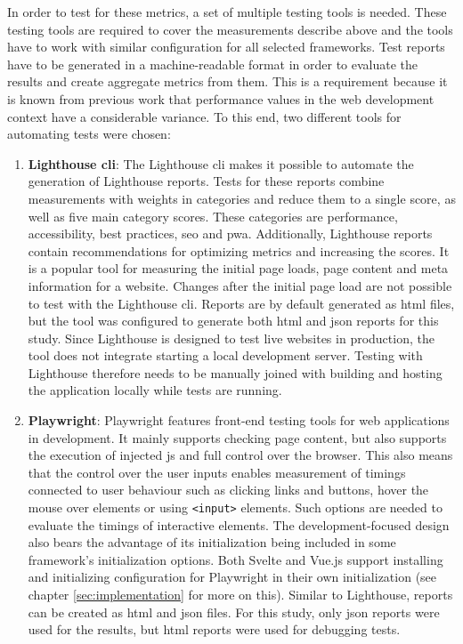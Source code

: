 \documentclass[a4paper, 12pt]{article}
\begin{document}
In order to test for these metrics, a set of multiple testing tools is needed.
These testing tools are required to cover the measurements describe above and the tools have to work with similar configuration for all selected frameworks.
Test reports have to be generated in a machine-readable format in order to evaluate the results and create aggregate metrics from them.
This is a requirement because it is known from previous work that performance values in the web development context have a considerable variance.
To this end, two different tools for automating tests were chosen:

\begin{enumerate}
  \item \textbf{Lighthouse \acrshort{cli}}: The Lighthouse \acrshort{cli} makes it possible to automate the generation of Lighthouse reports.
  Tests for these reports combine measurements with weights in categories and reduce them to a single score, as well as five main category scores.
  These categories are performance, accessibility, best practices, \acrfull{seo} and \acrfull{pwa}.
  Additionally, Lighthouse reports contain recommendations for optimizing metrics and increasing the scores.
  It is a popular tool for measuring the initial page loads, page content and meta information for a website.
  Changes after the initial page load are not possible to test with the Lighthouse \acrshort{cli}.
  Reports are by default generated as \acrshort{html} files, but the tool was configured to generate both \acrshort{html} and \acrshort{json} reports for this study.
  Since Lighthouse is designed to test live websites in production, the tool does not integrate starting a local development server.
  Testing with Lighthouse therefore needs to be manually joined with building and hosting the application locally while tests are running.
  \item \textbf{Playwright}: Playwright features front-end testing tools for web applications in development.
  It mainly supports checking page content, but also supports the execution of injected \acrlong{js} and full control over the browser.
  This also means that the control over the user inputs enables measurement of timings connected to user behaviour such as clicking links and buttons, hover the mouse over elements or using \verb|<input>| elements.
  Such options are needed to evaluate the timings of interactive elements.
  The development-focused design also bears the advantage of its initialization being included in some framework's initialization options.
  Both Svelte and Vue.js support installing and initializing configuration for Playwright in their own initialization (see chapter \ref{sec:implementation} for more on this).
  Similar to Lighthouse, reports can be created as \acrshort{html} and \acrshort{json} files.
  For this study, only \acrshort{json} reports were used for the results, but \acrshort{html} reports were used for debugging tests.
\end{enumerate}
\end{document}
